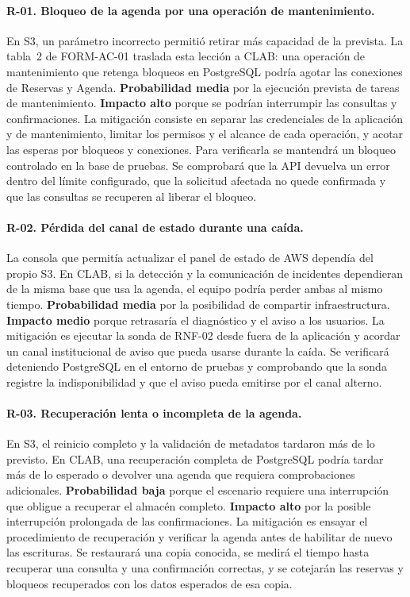 {  \paragraph{R-01. Bloqueo de la agenda por una operación de mantenimiento.}
  En S3, un parámetro incorrecto permitió retirar más capacidad de la
  prevista. La tabla~2 de FORM-AC-01 traslada esta lección a CLAB: una
  operación de mantenimiento que retenga bloqueos en PostgreSQL podría
  agotar las conexiones de Reservas y Agenda. \textbf{Probabilidad media}
  por la ejecución prevista de tareas de mantenimiento.
  \textbf{Impacto alto} porque se podrían interrumpir las consultas y
  confirmaciones. La mitigación consiste en separar las credenciales de
  la aplicación y de mantenimiento, limitar los permisos y el alcance de
  cada operación, y acotar las esperas por bloqueos y conexiones. Para
  verificarla se mantendrá un bloqueo controlado en la base de pruebas.
  Se comprobará que la API devuelva un error dentro del límite configurado,
  que la solicitud afectada no quede confirmada y que las consultas se
  recuperen al liberar el bloqueo.

  \paragraph{R-02. Pérdida del canal de estado durante una caída.}
  La consola que permitía actualizar el panel de estado de AWS dependía
  del propio S3. En CLAB, si la detección y la comunicación de incidentes
  dependieran de la misma base que usa la agenda, el equipo podría perder
  ambas al mismo tiempo. \textbf{Probabilidad media} por la posibilidad de
  compartir infraestructura. \textbf{Impacto medio} porque retrasaría el
  diagnóstico y el aviso a los usuarios. La mitigación es ejecutar la sonda
  de RNF-02 desde fuera de la aplicación y acordar un canal institucional
  de aviso que pueda usarse durante la caída. Se verificará deteniendo
  PostgreSQL en el entorno de pruebas y comprobando que la sonda registre
  la indisponibilidad y que el aviso pueda emitirse por el canal alterno.

  \paragraph{R-03. Recuperación lenta o incompleta de la agenda.}
  En S3, el reinicio completo y la validación de metadatos tardaron más
  de lo previsto. En CLAB, una recuperación completa de PostgreSQL podría
  tardar más de lo esperado o devolver una agenda que requiera comprobaciones
  adicionales. \textbf{Probabilidad baja} porque el escenario requiere
  una interrupción que obligue a recuperar el almacén completo.
  \textbf{Impacto alto} por la posible interrupción prolongada de las
  confirmaciones. La mitigación es ensayar el procedimiento de recuperación
  y verificar la agenda antes de habilitar de nuevo las escrituras. Se
  restaurará una copia conocida, se medirá el tiempo hasta recuperar una
  consulta y una confirmación correctas, y se cotejarán las reservas y
  bloqueos recuperados con los datos esperados de esa copia.

}
